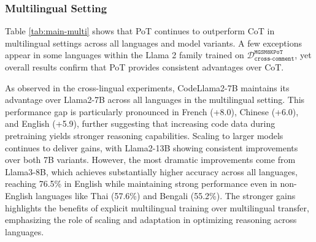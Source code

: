 




\subsubsection{Multilingual Setting}
%
Table \ref{tab:main-multi} shows that PoT continues to outperform CoT in multilingual settings across all languages and model variants.
%
A few exceptions appear in some languages within the Llama 2 family trained on $\mathcal{D}^\texttt{MGSM8KPoT}_\texttt{cross-comment}$, yet overall results confirm that PoT provides consistent advantages over CoT.

As observed in the cross-lingual experiments, CodeLlama2-7B maintains its advantage over Llama2-7B across all languages in the multilingual setting.
%
This performance gap is particularly pronounced in French (+8.0), Chinese (+6.0), and English (+5.9), further suggesting that increasing code data during pretraining yields stronger reasoning capabilities.
%
Scaling to larger models continues to deliver gains, with Llama2-13B showing consistent improvements over both 7B variants.
%
However, the most dramatic improvements come from Llama3-8B, which achieves substantially higher accuracy across all languages, reaching 76.5\% in English while maintaining strong performance even in non-English languages like Thai (57.6\%) and Bengali (55.2\%).
% 
The stronger gains highlights the benefits of explicit multilingual training over multilingual transfer, emphasizing the role of scaling and adaptation in optimizing reasoning across languages.
%











